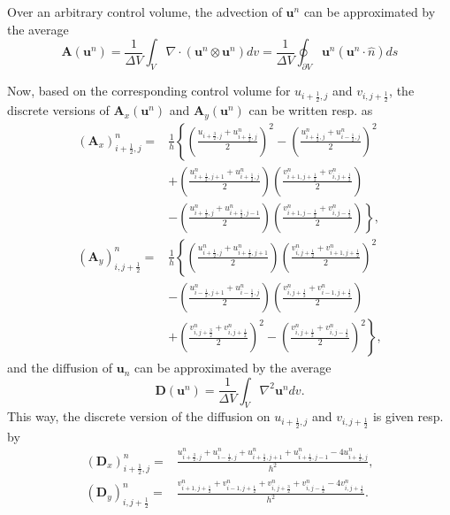 Over an arbitrary control volume, the advection of $\mathbf{u}^n$ can be approximated by the average
\begin{equation}
\mathbf{A}(\mathbf{u}^n)=\frac{1}{\Delta V}\int_V \nabla\cdot \left(\mathbf{u}^n\otimes \mathbf{u}^n\right)dv=\frac{1}{\Delta V}\oint_{\partial V} \mathbf{u}^n(\mathbf{u}^n\cdot \hat{n})ds
\end{equation}

Now, based on the corresponding control volume for $u_{i+\frac{1}{2},j}$ and $v_{i,j+\frac{1}{2}}$, the discrete  versions of $\mathbf{A}_x(\mathbf{u}^n)$ and $\mathbf{A}_y(\mathbf{u}^n)$ can be written resp. as
\begin{align*}
(\mathbf{A}_x)^n_{i+\frac{1}{2},j} = &\frac{1}{h}\left\{\left(\frac{u_{i+\frac{3}{2},j}+u^n_{i+\frac{1}{2},j}}{2}\right)^2-\left(\frac{u^n_{i+\frac{1}{2},j}+u^n_{i-\frac{1}{2},j}}{2}\right)^2\right.\\
&+\left(\frac{u^n_{i+\frac{1}{2},j+1}+u^n_{i+\frac{1}{2},j}}{2}\right)\left(\frac{v^n_{i+1,j+\frac{1}{2}}+v^n_{i,j+\frac{1}{2}}}{2}\right)\\
&-\left.\left(\frac{u^n_{i+\frac{1}{2},j}+u^n_{i+\frac{1}{2},j-1}}{2}\right)\left(\frac{v^n_{i+1,j-\frac{1}{2}}+v^n_{i,j-\frac{1}{2}}}{2}\right)\right\},\\
(\mathbf{A}_y)^n_{i,j+\frac{1}{2}} = &\frac{1}{h}\left\{\left(\frac{u^n_{i+\frac{1}{2},j}+u^n_{i+\frac{1}{2},j+1}}{2}\right)\left(\frac{v^n_{i,j+\frac{1}{2}}+v^n_{i+1,j+\frac{1}{2}}}{2}\right)^2\right.\\
&-\left(\frac{u^n_{i-\frac{1}{2},j+1}+u^n_{i-\frac{1}{2},j}}{2}\right)\left(\frac{v^n_{i,j+\frac{1}{2}}+v^n_{i-1,j+\frac{1}{2}}}{2}\right)\\
&+\left.\left(\frac{v^n_{i,j+\frac{3}{2}}+v^n_{i,j+\frac{1}{2}}}{2}\right)^2-\left(\frac{v^n_{i,j+\frac{1}{2}}+v^n_{i,j-\frac{1}{2}}}{2}\right)^2\right\},
\end{align*}
and the diffusion of $\mathbf{u}_n$ can be approximated by the average
\begin{equation}
\mathbf{D}(\mathbf{u}^n)=\frac{1}{\Delta V}\int_V \nabla^2\mathbf{u}^n dv.\label{eq:ap_app_du}
\end{equation}
This way, the discrete version of the diffusion on $u_{i+\frac{1}{2},j}$ and $v_{i,j+\frac{1}{2}}$ is given resp. by
\begin{align*}
(\mathbf{D}_x)^n_{i+\frac{1}{2},j}=&\frac{u_{i+\frac{3}{2},j}^n+u^n_{i-\frac{1}{2},j}+u^n_{i+\frac{1}{2},j+1}+u^n_{i+\frac{1}{2},j-1}-4u^n_{i+\frac{1}{2},j}}{h^2},\\
(\mathbf{D}_y)^n_{i,j+\frac{1}{2}}=&\frac{v_{i+1,j+\frac{1}{2}}^n+v^n_{i-1,j+\frac{1}{2}}+v^n_{i,j+\frac{3}{2}}+v^n_{i,j-\frac{1}{2}}-4v^n_{i,j+\frac{1}{2}}}{h^2}.
\end{align*}

